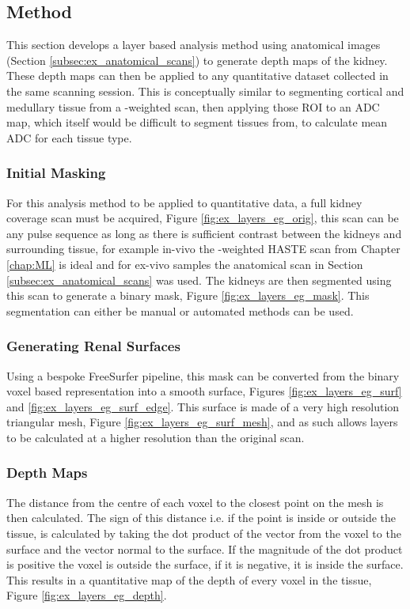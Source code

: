 \subsection{Method}
This section develops a layer based analysis method using anatomical images (Section \ref{subsec:ex_anatomical_scans}) to generate depth maps of the kidney. These depth maps can then be applied to any quantitative dataset collected in the same scanning session. This is conceptually similar to segmenting cortical and medullary tissue from a \tone-weighted scan, then applying those \ac{ROI} to an \ac{ADC} map, which itself would be difficult to segment tissues from, to calculate mean \ac{ADC} for each tissue type.

\subsubsection{Initial Masking}
For this analysis method to be applied to quantitative data, a full kidney coverage scan must be acquired, Figure \ref{fig:ex_layers_eg_orig}, this scan can be any pulse sequence as long as there is sufficient contrast between the kidneys and surrounding tissue, for example in-vivo the \ttwo-weighted \ac{HASTE} scan from Chapter \ref{chap:ML} is ideal and for ex-vivo samples the anatomical scan in Section \ref{subsec:ex_anatomical_scans} was used. The kidneys are then segmented using this scan to generate a binary mask, Figure \ref{fig:ex_layers_eg_mask}. This segmentation can either be manual or automated methods can be used. 

\subsubsection{Generating Renal Surfaces}
Using a bespoke FreeSurfer \cite{dale_cortical_1999} pipeline, this mask can be converted from the binary voxel based representation into a smooth surface, Figures \ref{fig:ex_layers_eg_surf} and \ref{fig:ex_layers_eg_surf_edge}. This surface is made of a very high resolution triangular mesh, Figure \ref{fig:ex_layers_eg_surf_mesh}, and as such allows layers to be calculated at a higher resolution than the original scan. 

\subsubsection{Depth Maps}
The distance from the centre of each voxel to the closest point on the mesh is then calculated. The sign of this distance i.e. if the point is inside or outside the tissue, is calculated by taking the dot product of the vector from the voxel to the surface and the vector normal to the surface. If the magnitude of the dot product is positive the voxel is outside the surface, if it is negative, it is inside the surface. This results in a quantitative map of the depth of every voxel in the tissue, Figure \ref{fig:ex_layers_eg_depth}.

